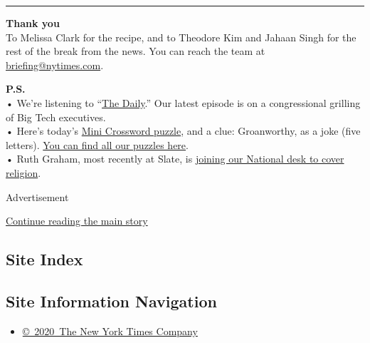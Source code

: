 \begin{center}\rule{0.5\linewidth}{\linethickness}\end{center}

\textbf{Thank you}\\
To Melissa Clark for the recipe, and to Theodore Kim and Jahaan Singh
for the rest of the break from the news. You can reach the team at
\href{mailto:briefing+midnight@nytimes.com?subject=Briefing\%20Feedback}{briefing@nytimes.com}.

\textbf{P.S.}\\
• We're listening to ``\href{https://www.nytimes.com/thedaily}{The
Daily}.'' Our latest episode is on a congressional grilling of Big Tech
executives.\\
• Here's today's
\href{https://www.nytimes.com/crosswords/game/mini}{Mini Crossword
puzzle}, and a clue: Groanworthy, as a joke (five letters).
\href{https://www.nytimes.com/crosswords}{You can find all our puzzles
here}.\\
• Ruth Graham, most recently at Slate, is
\href{https://www.nytco.com/press/ruth-graham-to-join-national/}{joining
our National desk to cover religion}.

Advertisement

\protect\hyperlink{after-bottom}{Continue reading the main story}

\hypertarget{site-index}{%
\subsection{Site Index}\label{site-index}}

\hypertarget{site-information-navigation}{%
\subsection{Site Information
Navigation}\label{site-information-navigation}}

\begin{itemize}
\tightlist
\item
  \href{https://help.nytimes.com/hc/en-us/articles/115014792127-Copyright-notice}{©~2020~The
  New York Times Company}
\end{itemize}

